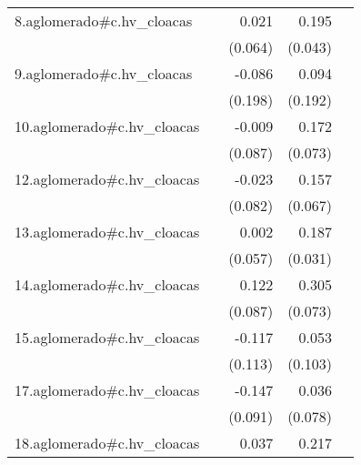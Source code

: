 {\begin{longtable}{l*{4}{D{.}{.}{-1}}}
\addlinespace
8.aglomerado#c.hv\_cloacas&                     &       0.021         &       0.195\sym{***}&                     \\
            &                     &     (0.064)         &     (0.043)         &                     \\
\addlinespace
9.aglomerado#c.hv\_cloacas&                     &      -0.086         &       0.094         &                     \\
            &                     &     (0.198)         &     (0.192)         &                     \\
\addlinespace
10.aglomerado#c.hv\_cloacas&                     &      -0.009         &       0.172\sym{*}  &                     \\
            &                     &     (0.087)         &     (0.073)         &                     \\
\addlinespace
12.aglomerado#c.hv\_cloacas&                     &      -0.023         &       0.157\sym{*}  &                     \\
            &                     &     (0.082)         &     (0.067)         &                     \\
\addlinespace
13.aglomerado#c.hv\_cloacas&                     &       0.002         &       0.187\sym{***}&                     \\
            &                     &     (0.057)         &     (0.031)         &                     \\
\addlinespace
14.aglomerado#c.hv\_cloacas&                     &       0.122         &       0.305\sym{***}&                     \\
            &                     &     (0.087)         &     (0.073)         &                     \\
\addlinespace
15.aglomerado#c.hv\_cloacas&                     &      -0.117         &       0.053         &                     \\
            &                     &     (0.113)         &     (0.103)         &                     \\
\addlinespace
17.aglomerado#c.hv\_cloacas&                     &      -0.147         &       0.036         &                     \\
            &                     &     (0.091)         &     (0.078)         &                     \\
\addlinespace
18.aglomerado#c.hv\_cloacas&                     &       0.037         &       0.217\sym{***}&                     \\

\end{longtable}}
